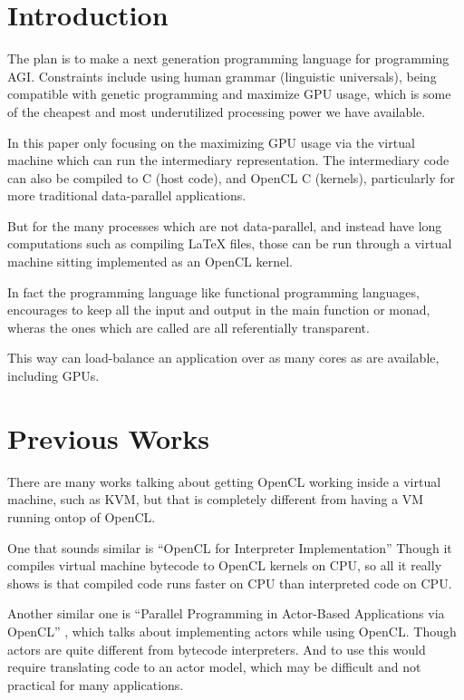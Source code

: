 \maketitle{}
\section{Introduction}

The plan is to make a next generation programming language for programming AGI\@.
Constraints include using human grammar (linguistic universals), being
compatible with genetic programming and maximize GPU usage, which is some of the
cheapest and most underutilized processing power we have available.

In this paper only focusing on the maximizing GPU usage via the virtual machine
which can run the intermediary representation.  The intermediary code can also
be compiled to C (host code), and OpenCL C (kernels), particularly for more
traditional data-parallel applications. 

But for the many processes which are not data-parallel, and instead have long
computations such as compiling \LaTeX{} files, those can be run through a virtual
machine sitting implemented as an OpenCL kernel.   

In fact the programming language like functional programming languages,
encourages to keep all the input and output in the main function or monad,
wheras the ones which are called are all referentially transparent.  

This way can load-balance an application over as many cores as are available,
including GPUs. 

\section{Previous Works}

There are many works talking about getting OpenCL working inside a virtual
machine, such as
KVM\cite{SPE:SPE2166}\cite{Gupta:2009:GGV:1519138.1519141}\cite{ratering2011accelerating}, but that is completely different from having a VM running
ontop of OpenCL.\@

One that sounds similar is ``OpenCL for Interpreter Implementation''\cite{OpenCLInterpret}
Though it compiles virtual machine bytecode to OpenCL kernels on CPU, so
all it really shows is that compiled code runs faster on CPU than interpreted code on CPU.\@

Another similar one is ``Parallel Programming in Actor-Based Applications via OpenCL''
\cite{Harvey:2015:PPA:2814576.2814732}, which talks about implementing actors 
while using OpenCL\@. Though actors are quite different from bytecode
interpreters. And to use this would require translating code to an actor model,
which may be difficult and not practical for many applications. 

